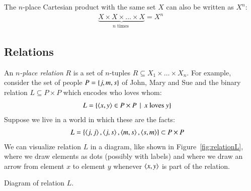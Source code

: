 \documentclass[nobib,nofonts]{tufte-handout}
\begin{document}
The $n$-place Cartesian product with the same set $X$ can also be written as $X^{n}$:
    \begin{align*}
      \underbrace{X \times X \times \dots \times X} _{n \text{ times }}= X^{n}
    \end{align*}

\subsection{Relations}

An \emph{$n$-place relation} $R$ is a set of $n$-tuples
$R \subseteq X_1 \times \dots \times X_n$.
For example, consider the set of people $P = \left\{j,m,s\right\}$ of John, Mary and Sue and the binary relation $L \subseteq P \times P$ which encodes who loves whom:
\begin{align*}
  L & = \left\{\left \langle x,y\right\rangle \in P \times P \thinspace \mid \thinspace \text{$x$ loves $y$}\right\}
\end{align*}
Suppose we live in a world in which these are the facts:
\begin{align*}
  L  & = \left\{\left \langle j,j\right\rangle, \left \langle j,s\right\rangle, \left \langle m,s\right\rangle, \left \langle s,m\right\rangle\right\} \subset P \times P
\end{align*}
\noindent We can visualize relation $L$ in a diagram, like shown in Figure~\ref{fig:relationL}, where we
draw elements as dots (possibly with labels) and where we draw an arrow from element $x$ to
element $y$ whenever $\left \langle x,y\right\rangle$ is part of the relation.
\begin{marginfigure}
\caption{Diagram of relation $L$.}
\label{fig:relationL}
\end{marginfigure}
\end{document}
